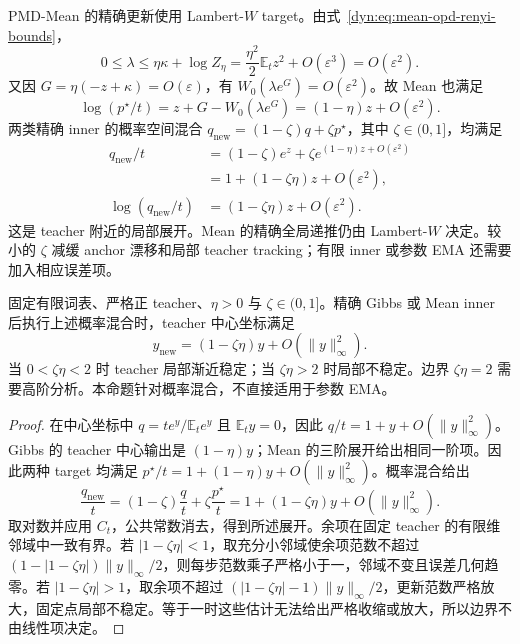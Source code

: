 \documentclass[lang=cn,scheme=chinese,openany]{../book/elegantbook}
\newcommand{\E}{\mathbb E}
\begin{document}
PMD-Mean 的精确更新使用 Lambert-$W$ target。由式~\eqref{dyn:eq:mean-opd-renyi-bounds}，
\begin{equation*}
0\le\lambda\le\eta\kappa+\log Z_\eta
=\frac{\eta^2}2\E_tz^2+O(\varepsilon^3)=O(\varepsilon^2).
\end{equation*}
又因 $G=\eta(-z+\kappa)=O(\varepsilon)$，有
$W_0(\lambda e^G)=O(\varepsilon^2)$。故 Mean 也满足
\begin{equation*}
\log(p^\star/t)=z+G-W_0(\lambda e^G)
=(1-\eta)z+O(\varepsilon^2).
\end{equation*}
两类精确 inner 的概率空间混合 $q_{\mathrm{new}}=(1-\zeta)q+\zeta p^\star$，其中 $\zeta\in(0,1]$，均满足
\begin{align*}
q_{\mathrm{new}}/t
&=(1-\zeta)e^z+\zeta e^{(1-\eta)z+O(\varepsilon^2)}\\
&=1+(1-\zeta\eta)z+O(\varepsilon^2),\\
\log(q_{\mathrm{new}}/t)
&=(1-\zeta\eta)z+O(\varepsilon^2).
\end{align*}
这是 teacher 附近的局部展开。Mean 的精确全局递推仍由 Lambert-$W$ 决定。较小的 $\zeta$ 减缓 anchor 漂移和局部 teacher tracking；有限 inner 或参数 EMA 还需要加入相应误差项。

\begin{proposition}
\label{dyn:soft-local}
固定有限词表、严格正 teacher、$\eta>0$ 与 $\zeta\in(0,1]$。精确 Gibbs 或 Mean inner 后执行上述概率混合时，teacher 中心坐标满足
\begin{equation}
y_{\mathrm{new}}=(1-\zeta\eta)y+O(\|y\|_\infty^2).
\end{equation}
当 $0<\zeta\eta<2$ 时 teacher 局部渐近稳定；当 $\zeta\eta>2$ 时局部不稳定。边界 $\zeta\eta=2$ 需要高阶分析。本命题针对概率混合，不直接适用于参数 EMA。
\end{proposition}
\begin{proof}
在中心坐标中 $q=t e^y/\E_te^y$ 且 $\E_ty=0$，因此 $q/t=1+y+O(\|y\|_\infty^2)$。Gibbs 的 teacher 中心输出是 $(1-\eta)y$；Mean 的三阶展开给出相同一阶项。因此两种 target 均满足 $p^\star/t=1+(1-\eta)y+O(\|y\|_\infty^2)$。概率混合给出
\begin{equation*}
\frac{q_{\mathrm{new}}}{t}
=(1-\zeta)\frac qt+\zeta\frac{p^\star}t
=1+(1-\zeta\eta)y+O(\|y\|_\infty^2).
\end{equation*}
取对数并应用 $C_t$，公共常数消去，得到所述展开。余项在固定 teacher 的有限维邻域中一致有界。若 $|1-\zeta\eta|<1$，取充分小邻域使余项范数不超过 $(1-|1-\zeta\eta|)\|y\|_\infty/2$，则每步范数乘子严格小于一，邻域不变且误差几何趋零。若 $|1-\zeta\eta|>1$，取余项不超过 $(|1-\zeta\eta|-1)\|y\|_\infty/2$，更新范数严格放大，固定点局部不稳定。等于一时这些估计无法给出严格收缩或放大，所以边界不由线性项决定。
\end{proof}
\end{document}
